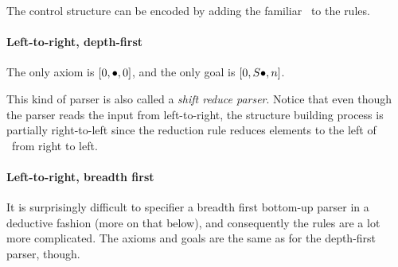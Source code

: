 The control structure can be encoded by adding the familiar \psep\ to the rules.

\paragraph{Left-to-right, depth-first}
The only axiom is $[0, \psep ,0]$, and the only goal is $[0,S \psep ,n]$.

\begin{prooftree}
\end{prooftree}

\begin{prooftree}
\end{prooftree}

This kind of parser is also called a \emph{shift reduce parser}.
Notice that even though the parser reads the input from left-to-right, the structure building process is partially right-to-left since the reduction rule reduces elements to the left of \psep\ from right to left.

\paragraph{Left-to-right, breadth first}
It is surprisingly difficult to specifier a breadth first bottom-up parser in a deductive fashion (more on that below), and consequently the rules are a lot more complicated.
The axioms and goals are the same as for the depth-first parser, though.

\begin{prooftree}
\end{prooftree}

\begin{prooftree}
\end{prooftree}

\begin{prooftree}
\end{prooftree}


